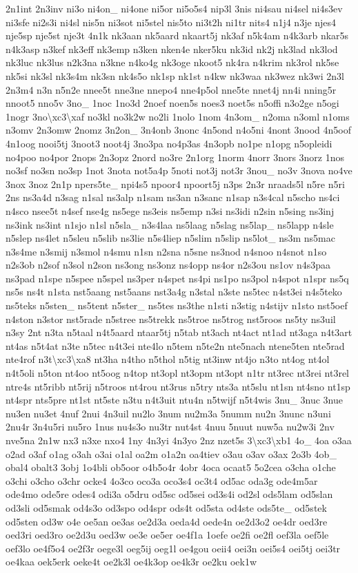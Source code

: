 {2n1int 2n3inv ni3o ni4on\-\_\- ni4one ni5or ni5o5s4 nip3l 3nis ni4sau ni4sel ni4s3ev ni3sfe ni2s3i ni4sl nis5n ni3sot ni5stel nis5to ni3t2h ni1tr nits4 n1j4 n3je njes4 nje5sp nje5st nje3t 4n1k nk3aan nk5aard nkaart5j nk3af n5k4am n4k3arb nkar5s n4k3asp n3kef nk3eff nk3emp n3ken nken4e nker5ku nk3id nk2j nk3lad nk3lod nk3luc nk3lus n2k3na n3kne n4ko4g nk3oge nkoot5 nk4ra n4krim nk3rol nk5se nk5si nk3sl nk3s4m nk3sn nk4s5o nk1sp nk1st n4kw nk3waa nk3wez nk3wi 2n3l 2n3m4 n3n n5n2e nnee5t nne3ne nnepo4 nne4p5ol nne5te nnet4j nn4i nning5r nnoot5 nno5v 3no\-\_\- 1noc 1no3d 2noef noen5s noes3 noet5s n5offi n3o2ge n5ogi 1nogr 3no\textbackslash{}xc3\textbackslash{}xaf no3kl no3k2w no2li 1nolo 1nom 4n3om\-\_\- n2oma n3oml n1oms n3omv 2n3omw 2nomz 3n2on\-\_\- 3n4onb 3nonc 4n5ond n4o5ni 4nont 3nood 4n5oof 4n1oog nooi5tj 3noot3 noot4j 3no3pa no4p3as 4n3opb no1pe n1opg n5opleidi no4poo no4por 2nops 2n3opz 2nord no3re 2n1org 1norm 4norr 3nors 3norz 1nos no3sf no3sn no3sp 1not 3nota not5a4p 5noti not3j not3r 3nou\-\_\- no3v 3nova no4ve 3nox 3noz 2n1p npers5te\-\_\- npi4s5 npoor4 npoort5j n3ps 2n3r nraads5l n5re n5ri 2ns ns3a4d n3sag n1sal ns3alp n1sam ns3an n3sanc n1sap n3s4cal n5scho ns4ci n4sco nsee5t n4sef nse4g ns5ege ns3eis ns5emp n3si ns3idi n2sin n5sing ns3inj ns3ink ns3int n1sjo n1sl n5sla\-\_\- n3s4laa ns5laag n5slag ns5lap\-\_\- ns5lapp n4sle n5slep ns4let n5sleu n5slib ns3lie n5s4liep n5slim n5slip ns5lot\-\_\- ns3m ns5mac n3s4me n3smij n3smol n4smu n1sn n2sna n5sne ns3nod n4snoo n4snot n1so n2s3ob n2sof n3sol n2son ns3ong ns3onz ns4opp ns4or n2s3ou ns1ov n4s3paa ns3pad n1spe n5spee n5spel ns3per n4spet ns4pi ns1po ns3pol n4spot n1spr ns5q ns5s ns4t n1sta nst5aang nst5aans nst3a4g n3stal n3ste ns5tec n4st3ei n4s5teko ns5teks n5sten\-\_\- ns5tent n5ster\-\_\- ns5tes ns3the n1sti n3stig n4stijv n1sto nst5oef n4ston n3stor nst5rade n5stree ns5trekk ns5troe ns5trog nst5roos ns5ty ns3uil n3sy 2nt n3ta n5taal n4t5aard ntaar5tj n5tab nt3ach nt4act nt1ad nt3aga n4t3art nt4as n5t4at n3te n5tec n4t3ei nte4lo n5tem n5te2n nte5nach ntene5ten nte5rad nte4rof n3t\textbackslash{}xc3\textbackslash{}xa8 nt3ha n4tho n5thol n5tig nt3inw nt4jo n3to nt4og nt4ol n4t5oli n5ton nt4oo nt5oog n4top nt3opl nt3opm nt3opt n1tr nt3rec nt3rei nt3rel ntre4s nt5ribb nt5rij n5troos nt4rou nt3rus n5try nts3a nt5slu nt1sn nt4sno nt1sp nt4spr nts5pre nt1st nt5ste n3tu n4t3uit ntu4n n5twijf n5t4wis 3nu\-\_\- 3nuc 3nue nu3en nu3et 4nuf 2nui 4n3uil nu2lo 3num nu2m3a 5numm nu2n 3nunc n3uni 2nu4r 3n4u5ri nu5ro 1nus nu4s3o nu3tr nut4st 4nuu 5nuut nuw5a nu2w3i 2nv nve5na 2n1w nx3 n3xe nxo4 1ny 4n3yi 4n3yo 2nz nzet5s 3\textbackslash{}xc3\textbackslash{}xb1 4o\-\_\- 4oa o3aa o2ad o3af o1ag o3ah o3ai o1al oa2m o1a2n oa4tiev o3au o3av o3ax 2o3b 4ob\-\_\- obal4 obalt3 3obj 1o4bli ob5oor o4b5o4r 4obr 4oca ocaat5 5o2cea o3cha o1che o3chi o3cho o3chr ocke4 4o3co oco3a oco3s4 oc3t4 od5ac oda3g ode4m5ar ode4mo ode5re odes4 odi3a o5dru od5sc od5sei od3s4i od2sl ods5lam od5slan od3sli od5smak od4s3o od3spo od4spr ods4t od5sta od4ste ods5te\-\_\- od5stek od5sten od3w o4e oe5an oe3as oe2d3a oeda4d oede4n oe2d3o2 oe4dr oed3re oed3ri oed3ro oe2d3u oed3w oe3e oe5er oe4f1a 1oefe oe2fi oe2fl oef3la oef5le oef3lo oe4f5o4 oe2f3r oege3l oeg5ij oeg1l oe4gou oeii4 oei3n oei5s4 oei5tj oei3tr oe4kaa oek5erk oeke4t oe2k3l oe4k3op oe4k3r oe2ku oek1w }
